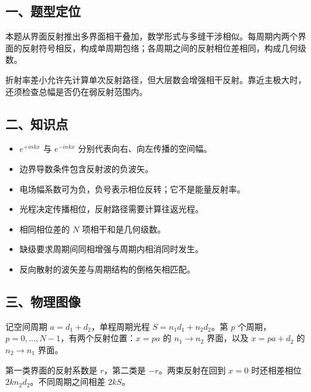 \documentclass[12pt,a4paper,fontset=fandol]{ctexart}
\providecommand{\tightlist}{\setlength{\itemsep}{0pt}\setlength{\parskip}{0pt}}
\begin{document}
\subsection{一、题型定位}\label{ux4e00ux9898ux578bux5b9aux4f4d-6}

本题从界面反射推出多界面相干叠加，数学形式与多缝干涉相似。每周期内两个界面的反射符号相反，构成单周期包络；各周期之间的反射相位差相同，构成几何级数。

折射率差小允许先计算单次反射路径，但大层数会增强相干反射。靠近主极大时，还须检查总幅是否仍在弱反射范围内。

\subsection{二、知识点}\label{ux4e8cux77e5ux8bc6ux70b9-6}

\begin{itemize}
\tightlist
\item
  \(e^{+inkx}\) 与 \(e^{-inkx}\) 分别代表向右、向左传播的空间幅。
\item
  边界导数条件包含反射波的负波矢。
\item
  电场幅系数可为负，负号表示相位反转；它不是能量反射率。
\item
  光程决定传播相位，反射路径需要计算往返光程。
\item
  相同相位差的 \(N\) 项相干和是几何级数。
\item
  缺级要求周期间同相增强与周期内相消同时发生。
\item
  反向散射的波矢差与周期结构的倒格矢相匹配。
\end{itemize}

\subsection{三、物理图像}\label{ux4e09ux7269ux7406ux56feux50cf-6}

记空间周期 \(a=d_1+d_2\)，单程周期光程 \(S=n_1d_1+n_2d_2\)。第 \(p\)
个周期，\(p=0,\ldots,N-1\)，有两个反射位置：\(x=pa\) 的 \(n_1\to n_2\)
界面，以及 \(x=pa+d_2\) 的 \(n_2\to n_1\) 界面。

第一类界面的反射系数是 \(r\)，第二类是 \(-r\)。两束反射在回到 \(x=0\)
时还相差相位 \(2kn_2d_2\)。不同周期之间相差 \(2kS\)。
\end{document}
